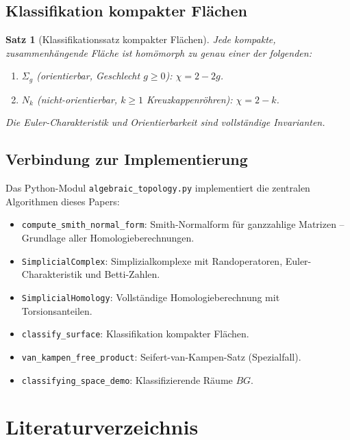 \documentclass[12pt,a4paper]{amsart}
\newtheorem{theorem}{Satz}[section]
\theoremstyle{definition}
\begin{document}
\subsection{Klassifikation kompakter Fl\"achen}

\begin{theorem}[Klassifikationssatz kompakter Fl\"achen]
Jede kompakte, zusammenh\"angende Fl\"ache ist hom\"omorph zu genau einer der
folgenden:
\begin{enumerate}[label=(\roman*)]
  \item $\Sigma_g$ (orientierbar, Geschlecht $g \geq 0$): $\chi = 2-2g$.
  \item $N_k$ (nicht-orientierbar, $k \geq 1$ Kreuzkappenröhren): $\chi = 2-k$.
\end{enumerate}
Die Euler-Charakteristik und Orientierbarkeit sind vollst\"andige Invarianten.
\end{theorem}

\subsection{Verbindung zur Implementierung}

Das Python-Modul \texttt{algebraic\_topology.py} implementiert die zentralen
Algorithmen dieses Papers:
\begin{itemize}
  \item \texttt{compute\_smith\_normal\_form}: Smith-Normalform für ganzzahlige
    Matrizen -- Grundlage aller Homologieberechnungen.
  \item \texttt{SimplicialComplex}: Simplizialkomplexe mit Randoperatoren,
    Euler-Charakteristik und Betti-Zahlen.
  \item \texttt{SimplicialHomology}: Vollst\"andige Homologieberechnung mit
    Torsionsanteilen.
  \item \texttt{classify\_surface}: Klassifikation kompakter Fl\"achen.
  \item \texttt{van\_kampen\_free\_product}: Seifert-van-Kampen-Satz (Spezialfall).
  \item \texttt{classifying\_space\_demo}: Klassifizierende R\"aume $BG$.
\end{itemize}

\section*{Literaturverzeichnis}
\end{document}
